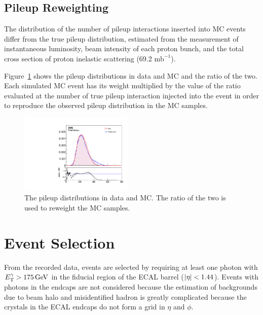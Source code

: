 

\subsection{Pileup Reweighting}
\label{sec:puweight}

The distribution of the number of pileup interactions inserted into MC events differ from the true pileup distribution, estimated from the measurement of instantaneous luminosity, beam intensity of each proton bunch, and the total cross section of proton inelastic scattering (69.2 $\textrm{mb}^{-1}$). 

Figure~\ref{fig:pudist} shows the pileup distributions in data and MC and the ratio of the two. 
Each simulated MC event has its weight multiplied by the value of the ratio evaluated at the number of true pileup interaction injected into the event in order to reproduce the observed pileup distribution in the MC samples. 

\begin{figure}[htbp]
  \centering
  \includegraphics[width=0.48\textwidth]{Analysis/Figures/PUMoriond17.pdf}
  \caption{
    The pileup distributions in data and MC.
    The ratio of the two is used to reweight the MC samples.
  }
  \label{fig:pudist}
\end{figure}

\section{Event Selection}
\label{sec:event_selection}

From the recorded data, events are selected by requiring at least one photon with $E_{\mathrm{T}}^{\gamma} > 175\,\text{Ge\hspace{-.08em}V}$ in the fiducial region of the ECAL barrel ($\lvert \eta \rvert < 1.44$).
Events with photons in the endcaps are not considered because the estimation of backgrounds due to beam halo and misidentified hadron is greatly complicated because the crystals in the ECAL endcaps do not form a grid in $\eta$ and $\phi$.

